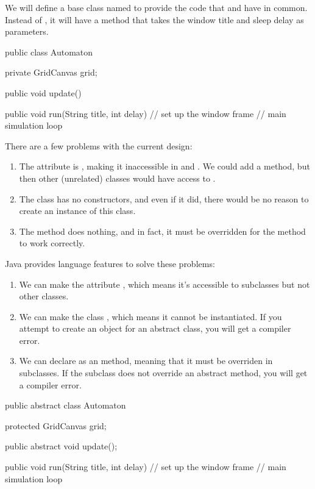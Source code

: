 We will define a base class named  to provide the code that  and  have in common.
Instead of , it will have a  method that takes the window title and sleep delay as parameters.

\begin{code}
public class Automaton {
    private GridCanvas grid;

    public void update() {
    }

    public void run(String title, int delay) {
        // set up the window frame
        // main simulation loop
    }
}
\end{code}

There are a few problems with the current design:
\begin{enumerate}
\item The  attribute is , making it inaccessible in  and .
We could add a  method, but then other (unrelated) classes would have access to .
\item The  class has no constructors, and even if it did, there would be no reason to create an instance of this class.
\item The  method does nothing, and in fact, it must be overridden for the  method to work correctly.
\end{enumerate}


Java provides language features to solve these problems:
\begin{enumerate}
\item We can make the  attribute , which means it's accessible to subclasses but not other classes.
\item We can make the class , which means it cannot be instantiated.
If you attempt to create an object for an abstract class, you will get a compiler error.
\item We can declare  as an  method, meaning that it must be overriden in subclasses.
If the subclass does not override an abstract method, you will get a compiler error.
\end{enumerate}

\begin{code}
public abstract class Automaton {
    protected GridCanvas grid;

    public abstract void update();

    public void run(String title, int delay) {
        // set up the window frame
        // main simulation loop
    }
}
\end{code}

